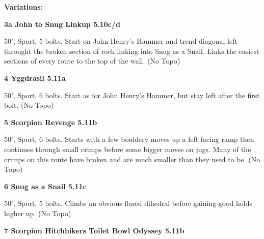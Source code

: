 \begin{multicols}{2}
\begin{adjustwidth}{0.5cm}{}				
\needspace{3cm}
\textbf{Variations:} \newline

\needspace{1.5cm}
\label{vr:John to Snug Linkup}
\colorbox{RoyalBlue!20}{
\parbox{0.95\linewidth}{
\textbf{
3a John to Snug Linkup 5.10c/d  
}}}

\begin{adjustwidth}{0.5cm}{}			
50', Sport, 5 bolts. Start on John Henry's Hammer and trend diagonal left throught the broken section of rock linking into Snug as a Snail. Links the easiest sections of every route to the top of the wall. (No Topo)
\end{adjustwidth}


\end{adjustwidth}


\needspace{1.5cm}
\label{rt:Yggdrasil}
\colorbox{RoyalBlue!20}{
\parbox{0.95\linewidth}{
\textbf{
4 Yggdrasil 5.11a  
}}}

\begin{adjustwidth}{0.5cm}{}			
50', Sport, 6 bolts. Start as for John Henry's Hammer, but stay left after the first bolt. (No Topo)
\end{adjustwidth}



\needspace{1.5cm}
\label{rt:Scorpion Revenge}
\colorbox{RoyalBlue!20}{
\parbox{0.95\linewidth}{
\textbf{
5 Scorpion Revenge 5.11b  
}}}

\begin{adjustwidth}{0.5cm}{}			
50', Sport, 6 bolts. Starts with a few bouldery moves up a left facing ramp then continues through small crimps before some bigger moves on jugs. Many of the crimps on this route have broken and are much smaller than they used to be. (No Topo)
\end{adjustwidth}



\needspace{1.5cm}
\label{rt:Snug as a Snail}
\colorbox{RoyalBlue!20}{
\parbox{0.95\linewidth}{
\textbf{
6 Snug as a Snail 5.11c  
}}}

\begin{adjustwidth}{0.5cm}{}			
50', Sport, 5 bolts. Climbs an obvious flared dihedral before gaining good holds higher up. (No Topo)
\end{adjustwidth}



\needspace{1.5cm}
\label{rt:Scorpion Hitchhikers Toilet Bowl Odyssey}
\colorbox{RoyalBlue!20}{
\parbox{0.95\linewidth}{
\textbf{
7 Scorpion Hitchhikers Toilet Bowl Odyssey 5.11b  
}}}


\end{multicols}
